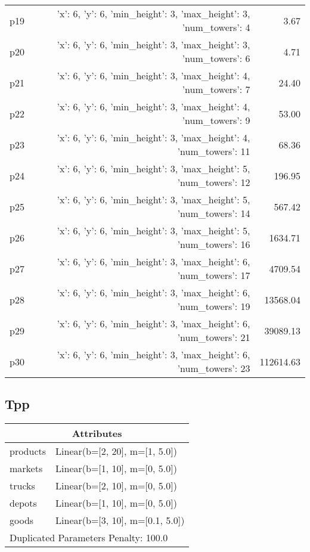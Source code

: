 \documentclass{article}
\begin{document}
\begin{center}
\begin{tabular}{@{}l|r|r@{}}
  p19&{'x': 6, 'y': 6, 'min\_height': 3, 'max\_height': 3, 'num\_towers': 4}&3.67\\
  p20&{'x': 6, 'y': 6, 'min\_height': 3, 'max\_height': 3, 'num\_towers': 6}&4.71\\
  p21&{'x': 6, 'y': 6, 'min\_height': 3, 'max\_height': 4, 'num\_towers': 7}&24.40\\
  p22&{'x': 6, 'y': 6, 'min\_height': 3, 'max\_height': 4, 'num\_towers': 9}&53.00\\
  p23&{'x': 6, 'y': 6, 'min\_height': 3, 'max\_height': 4, 'num\_towers': 11}&68.36\\
  p24&{'x': 6, 'y': 6, 'min\_height': 3, 'max\_height': 5, 'num\_towers': 12}&196.95\\
  p25&{'x': 6, 'y': 6, 'min\_height': 3, 'max\_height': 5, 'num\_towers': 14}&567.42\\
  p26&{'x': 6, 'y': 6, 'min\_height': 3, 'max\_height': 5, 'num\_towers': 16}&1634.71\\
  p27&{'x': 6, 'y': 6, 'min\_height': 3, 'max\_height': 6, 'num\_towers': 17}&4709.54\\
  p28&{'x': 6, 'y': 6, 'min\_height': 3, 'max\_height': 6, 'num\_towers': 19}&13568.04\\
  p29&{'x': 6, 'y': 6, 'min\_height': 3, 'max\_height': 6, 'num\_towers': 21}&39089.13\\
  p30&{'x': 6, 'y': 6, 'min\_height': 3, 'max\_height': 6, 'num\_towers': 23}&112614.63
                            \end{tabular}
                            \end{center}
                    
                            \newpage \subsection{Tpp}
                    \begin{center}
                    \begin{tabular}{@{}p{}p{}@{}}
                    \multicolumn{2}{c}{\bf \large Attributes}\\\midrule
                    products & Linear(b=[2, 20], m=[1, 5.0])\\
markets & Linear(b=[1, 10], m=[0, 5.0])\\
trucks & Linear(b=[2, 10], m=[0, 5.0])\\
depots & Linear(b=[1, 10], m=[0, 5.0])\\
goods & Linear(b=[3, 10], m=[0.1, 5.0]) \\\midrule
                    \multicolumn{2}{l}{Duplicated Parameters Penalty: 100.0}
                    \end{tabular}
                    \end{center}
                
\end{document}

